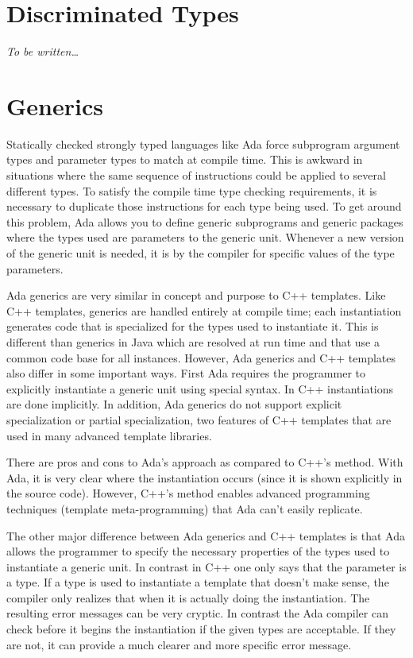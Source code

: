 \section{Discriminated Types}

\emph{To be written\ldots}

\section{Generics}

Statically checked strongly typed languages like Ada force subprogram argument types and
parameter types to match at compile time. This is awkward in situations where the same sequence
of instructions could be applied to several different types. To satisfy the compile time type
checking requirements, it is necessary to duplicate those instructions for each type being used.
To get around this problem, Ada allows you to define generic subprograms and generic packages
where the types used are parameters to the generic unit. Whenever a new version of the generic
unit is needed, it is  by the compiler for specific values of the type
parameters.

Ada generics are very similar in concept and purpose to C++ templates. Like C++ templates,
generics are handled entirely at compile time; each instantiation generates code that is
specialized for the types used to instantiate it. This is different than generics in Java which
are resolved at run time and that use a common code base for all instances. However, Ada
generics and C++ templates also differ in some important ways. First Ada requires the programmer
to explicitly instantiate a generic unit using special syntax. In C++ instantiations are done
implicitly. In addition, Ada generics do not support explicit specialization or partial
specialization, two features of C++ templates that are used in many advanced template libraries.

There are pros and cons to Ada's approach as compared to C++'s method. With Ada, it is very
clear where the instantiation occurs (since it is shown explicitly in the source code). However,
C++'s method enables advanced programming techniques (template meta-programming) that Ada can't
easily replicate.

The other major difference between Ada generics and C++ templates is that Ada allows the
programmer to specify the necessary properties of the types used to instantiate a generic unit.
In contrast in C++ one only says that the parameter is a type. If a type is used to instantiate
a template that doesn't make sense, the compiler only realizes that when it is actually doing
the instantiation. The resulting error messages can be very cryptic. In contrast the Ada
compiler can check before it begins the instantiation if the given types are acceptable. If they
are not, it can provide a much clearer and more specific error message.

